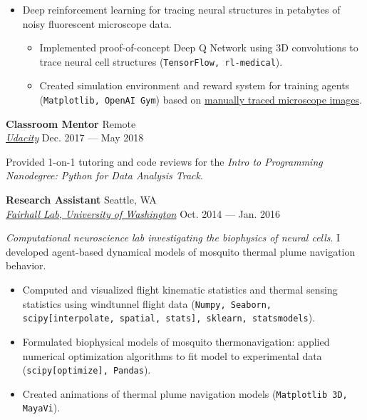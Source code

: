 \documentclass[a4paper,12pt]{article}
\newcommand{\ressubheading}[4]{{\begin{minipage}{\textwidth}
                                    \textbf{#1} \hfill #2 \\
                                    \textit{#3} \hfill #4 \\
\end{minipage}}}
\begin{document}
    \begin{itemize}
        \item Deep reinforcement learning for tracing neural structures in petabytes of noisy fluorescent microscope data.

        \begin{itemize}
            \item Implemented proof-of-concept Deep Q Network using 3D convolutions to trace neural cell structures (\texttt{TensorFlow, rl-medical}).
            \item Created simulation environment and reward system for training agents (\texttt{Matplotlib, OpenAI Gym}) based on \href{https://static-content.springer.com/esm/art%3A10.1038%2Fs41467-019-11443-y/MediaObjects/41467_2019_11443_MOESM4_ESM.mp4}{manually traced microscope images}.

        \end{itemize}

    \end{itemize}

    \ressubheading{Classroom Mentor}{Remote}{\href{udacity.com}{Udacity}}{Dec. 2017 --- May 2018}

    Provided 1-on-1 tutoring and code reviews for the \textit{Intro to Programming Nanodegree: Python for Data Analysis Track}.\\

    \ressubheading{Research Assistant}{Seattle, WA}{\href{https://compneuro.washington.edu/}{Fairhall Lab, University of Washington}}{Oct. 2014 --- Jan. 2016}

    \vspace{-6pt} \textit{Computational neuroscience lab investigating the biophysics of neural cells}. I developed agent-based dynamical models of mosquito thermal plume navigation behavior.

    \begin{itemize}
        \item Computed and visualized flight kinematic statistics and thermal sensing statistics using windtunnel flight data (\texttt{Numpy, Seaborn, scipy[interpolate, spatial, stats], sklearn, statsmodels}).
        \item Formulated biophysical models of mosquito thermonavigation:
        applied numerical optimization algorithms to fit model to experimental data (\texttt{scipy[optimize], Pandas}).
        \item Created animations of thermal plume navigation models (\texttt{Matplotlib 3D, MayaVi}).
    \end{itemize}
\end{document}
